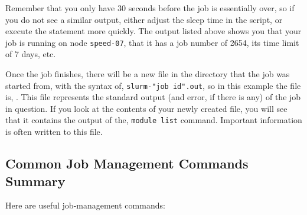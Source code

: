 Remember that you only have 30 seconds before the job is essentially over, so 
if you do not see a similar output, either adjust the sleep time in the 
script, or execute the  statement more quickly. The  
output listed above shows you that your job is 
running on node \texttt{speed-07}, that it has a job number of 2654,
its time limit of 7 days, etc.

Once the job finishes, there will be a new file in the directory that the job 
was started from, with the syntax of, \texttt{slurm-"job id".out}, so 
in this example the file is, . This file represents the 
standard output (and error, if there is any) of the job in question. If you 
look at the contents of your newly created file, you will see that it 
contains the output of the, \texttt{module list} command. 
Important information is often written to this file.
%

\subsection{Common Job Management Commands Summary}
\label{sect:job-management-commands}

Here are useful job-management commands: 

